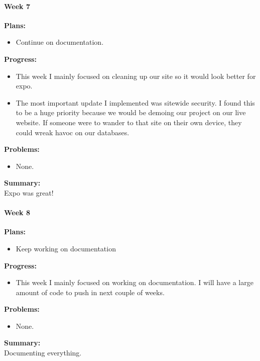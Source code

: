 \paragraph{Week 7}
\begin{adjustwidth}{2.5em}{0pt}
    \vspace{-0.5cm}\textbf{Plans:}
    \vspace{-0.5cm}
    \begin{itemize}
        \item Continue on documentation. 
    \end{itemize} 
    \vspace{-0.3cm}\textbf{Progress:}
    \vspace{-0.5cm}
    \begin{itemize}
        \item This week I mainly focused on cleaning up our site so it would look better for expo. 
		\item The most important update I implemented was sitewide security. I found this to be a huge priority because we would be demoing our project on our live website. If someone were to wander to that site on their own device, they could wreak havoc on our databases.
    \end{itemize} 
    \vspace{-0.3cm}\textbf{Problems:}
    \vspace{-0.5cm}
    \begin{itemize}
        \item None. 
    \end{itemize}  
    \vspace{-0.3cm}\noindent\textbf{Summary:}\\
    \noindent Expo was great! 
\end{adjustwidth} 
\paragraph{Week 8}
\begin{adjustwidth}{2.5em}{0pt}
    \vspace{-0.5cm}\textbf{Plans:}
    \vspace{-0.5cm}
    \begin{itemize}
        \item Keep working on documentation 
    \end{itemize} 
    \vspace{-0.3cm}\textbf{Progress:}
    \vspace{-0.5cm}
    \begin{itemize}
        \item This week I mainly focused on working on documentation. I will have a large amount of code to push in next couple of weeks.
    \end{itemize} 
    \vspace{-0.3cm}\textbf{Problems:}
    \vspace{-0.5cm}
    \begin{itemize}
        \item None.
    \end{itemize}  
    \vspace{-0.3cm}\noindent\textbf{Summary:}\\
    \noindent Documenting everything.  
\end{adjustwidth} 
